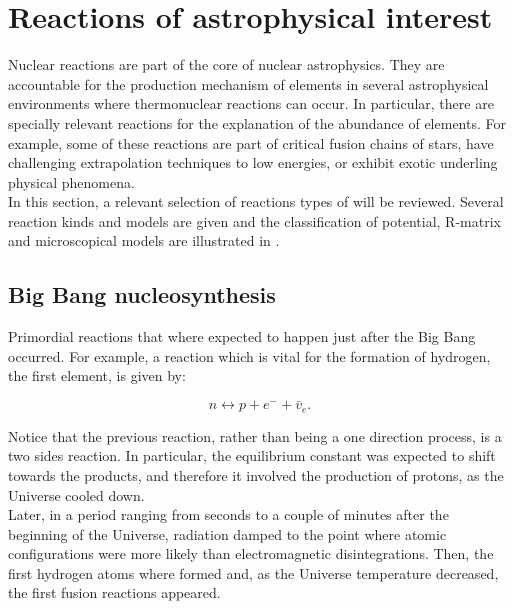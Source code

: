 \documentclass[openany]{book}
\begin{document}
\chapter{Reactions of astrophysical interest}  \label{ch:reactionsInterest}

Nuclear reactions are part of the core of nuclear astrophysics. They are accountable for the production mechanism of elements in several astrophysical environments where thermonuclear reactions can occur. In particular, there are specially relevant reactions for the explanation of the abundance of elements. For example, some of these reactions are part of critical fusion chains of stars, have challenging extrapolation techniques to low energies, or  exhibit exotic underling physical phenomena.   \\

In this section, a relevant selection of reactions types of will be reviewed.  Several reaction kinds and models are given and the classification of potential, R-matrix and microscopical models are illustrated in \cite{descouvemont_2020}.



\section{Big Bang nucleosynthesis} \label{sec:BBN}

Primordial reactions that where expected to happen just after the Big Bang occurred. For example, a reaction which is vital for the formation of hydrogen, the first element, is given by: 

\begin{equation} \label{eq:reaction_BBN_nEqp}
	n \leftrightarrow p + e^{-} + \bar v_{e}. 
\end{equation}

Notice that the previous reaction, rather than being a one direction process, is a two sides reaction. In particular, the equilibrium constant was expected to shift towards the products, and therefore it involved the production of protons, as the Universe cooled down. \\

Later, in a period ranging from seconds to a couple of minutes after the beginning of the Universe, radiation damped to the point where atomic configurations were more likely than electromagnetic disintegrations. Then, the first hydrogen atoms where formed and, as the Universe temperature decreased, the first fusion reactions appeared.  \\
\end{document}
